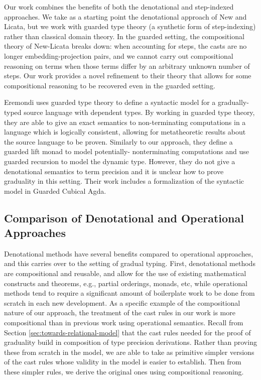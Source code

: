 Our work combines the benefits of both the denotational and step-indexed
approaches. We take as a starting point the denotational approach of New and
Licata, but we work with guarded type theory (a synthetic form of step-indexing)
rather than classical domain theory. In the guarded setting, the compositional
theory of New-Licata breaks down: when accounting for steps, the casts are no
longer embedding-projection pairs, and we cannot carry out compositional
reasoning on terms when those terms differ by an arbitrary unknown number of
steps. Our work provides a novel refinement to their theory that allows for some
compositional reasoning to be recovered even in the guarded setting.

Eremondi \cite{Eremondi_2023} uses guarded type theory to
define a syntactic model for a gradually-typed source
language with dependent types. By working in guarded type theory, they are
able to give an exact semantics to non-terminating computations in a language
which is logically consistent, allowing for metatheoretic results about the
source language to be proven.
%
Similarly to our approach, they define a guarded lift monad to model potentially-
nonterminating computations and use guarded recursion to model the dynamic type.
However, they do not give a denotational semantics to term precision and it is unclear
how to prove graduality in this setting.
Their work includes a formalization of the syntactic model in Guarded Cubical Agda.

\subsection{Comparison of Denotational and Operational Approaches}

Denotational methods have several benefits compared to operational approaches,
and this carries over to the setting of gradual typing. First, denotational
methods are compositional and reusable, and allow for the use of existing
mathematical constructs and theorems, e.g., partial orderings, monads, etc,
while operational methods tend to require a significant amount of boilerplate
work to be done from scratch in each new development.
%
As a specific example of the compositional nature of our approach, the treatment
of the cast rules in our work is more compositional than in previous work using
operational semantics. Recall from Section \ref{sec:towards-relational-model}
that the cast rules needed for the proof of graduality build in composition of
type precision derivations. Rather than proving these from scratch in the model,
we are able to take as primitive simpler versions of the cast rules whose
validity in the model is easier to establish. Then from these simpler rules, we
derive the original ones using compositional reasoning.

